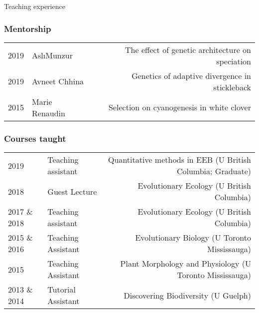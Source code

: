 \documentclass[11pt]{article}
\let\tikzi=\i %
\begin{document}
\noindent
\begin{rSection}{Teaching experience} %

\noindent
\subsubsection*{Mentorship}

\begin{tabular}{llr}


2019 & Asl\tikzi \space Munzur & The effect of genetic architecture on speciation\\
2019 & Avneet Chhina & Genetics of adaptive divergence in stickleback\\
2015 & Marie Renaudin & Selection on cyanogenesis in white clover
\end{tabular}

\subsubsection*{Courses taught}
\indent
\begin{tabular}{llr}

2019 & Teaching assistant & Quantitative methods in EEB (U British Columbia; Graduate)\\  %
2018 & Guest Lecture & Evolutionary Ecology (U British Columbia)\\ %
2017 \& 2018 & Teaching assistant & Evolutionary Ecology (U British Columbia)\\ %
2015 \& 2016 & Teaching Assistant & Evolutionary Biology (U Toronto Mississauga)\\ %
2015 & Teaching Assistant & Plant Morphology and Physiology (U Toronto Mississauga)\\ %
2013 \& 2014 & Tutorial Assistant & Discovering Biodiversity (U Guelph) %
\end{tabular}

\end{rSection}

\begin{tabular}{llr}


\end{tabular}
\end{document}
